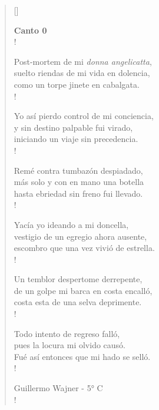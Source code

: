 \documentclass[11pt, a4paper]{article}
\begin{document}
{\sffamily

\vspace{\stanzaskip}

\settowidth{\versewidth}{costa esta de una selva deprimente.}

\begin{verse}[\versewidth]

\textbf{\large{Canto 0}}\\!

Post-mortem de mi \textit{donna angelicatta},\\
suelto riendas de mi vida en dolencia,\\
como un torpe jinete en cabalgata.\\!

Yo así pierdo control de mi conciencia,\\
y sin destino palpable fui virado,\\
iniciando un viaje sin precedencia.\\!

Remé contra tumbazón despiadado,\\
más solo y con en mano una botella\\
hasta ebriedad sin freno fui llevado.\\!

Yacía yo ideando a mi doncella,\\
vestigio de un egregio ahora ausente,\\
escombro que una vez vivió de estrella.\\!

Un temblor despertome derrepente,\\
de un golpe mi barca en costa encalló,\\
costa esta de una selva deprimente.\\!

Todo intento de regreso falló,\\
pues la locura mi olvido causó.\\
Fué así entonces que mi hado se selló.\\!

\vspace{\stanzaskip}

Guillermo Wajner - 5° C\\!

\end{verse}

}
\end{document}
